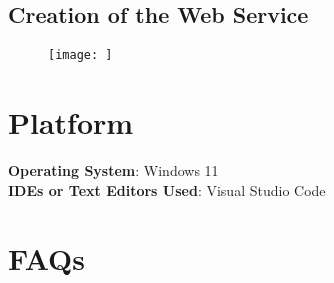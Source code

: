 \documentclass[11pt]{article}
\begin{document}
\subsection{Creation of the Web Service}
\begin{figure}[H]
    \centering
    \texttt{[image: ]}
    \caption{}
\end{figure}

\section{Platform}
\textbf{Operating System}: Windows 11 \\
\textbf{IDEs or Text Editors Used}: Visual Studio Code\\

% 

\section{FAQs}
\end{document}
